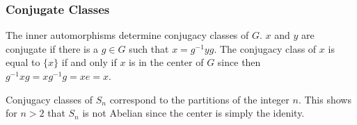 \documentclass{article}                                                        %
\begin{document}
            \subsubsection{Conjugate Classes}
                The inner automorphisms determine conjugacy classes of $G$.
                $x$ and $y$ are conjugate if there is a $g\in{G}$ such that
                $x=g^{\minus{1}}yg$. The conjugacy class of $x$ is equal to
                $\{x\}$ if and only if $x$ is in the center of $G$ since then
                $g^{\minus{1}}xg=xg^{\minus{1}}g=xe=x$.
                \begin{example}
                    Conjugacy classes of $S_{n}$ correspond to the partitions of
                    the integer $n$. This shows for $n>2$ that $S_{n}$ is not
                    Abelian since the center is simply the idenity.
                \end{example}
\end{document}
